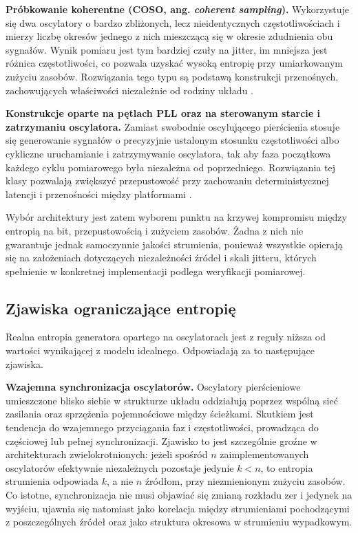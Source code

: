 \textbf{Próbkowanie koherentne (COSO, ang. \emph{coherent sampling}).}
Wykorzystuje się dwa oscylatory o bardzo zbliżonych, lecz nieidentycznych
częstotliwościach i mierzy liczbę okresów jednego z nich mieszczącą się
w okresie zdudnienia obu sygnałów. Wynik pomiaru jest tym bardziej czuły na
jitter, im mniejsza jest różnica częstotliwości, co pozwala uzyskać wysoką
entropię przy umiarkowanym zużyciu zasobów. Rozwiązania tego typu są
podstawą konstrukcji przenośnych, zachowujących właściwości niezależnie od
rodziny układu \cite{peetermans2019portable}.

\textbf{Konstrukcje oparte na pętlach PLL oraz na sterowanym starcie
i zatrzymaniu oscylatora.} Zamiast swobodnie oscylującego pierścienia
stosuje się generowanie sygnałów o precyzyjnie ustalonym stosunku
częstotliwości albo cykliczne uruchamianie i zatrzymywanie oscylatora, tak
aby faza początkowa każdego cyklu pomiarowego była niezależna od
poprzedniego. Rozwiązania tej klasy pozwalają zwiększyć przepustowość przy
zachowaniu deterministycznej latencji i przenośności między
platformami \cite{matuszewski2024startstop}.

Wybór architektury jest zatem wyborem punktu na krzywej kompromisu między
entropią na bit, przepustowością i zużyciem zasobów. Żadna z nich nie
gwarantuje jednak samoczynnie jakości strumienia, ponieważ wszystkie opierają
się na założeniach dotyczących niezależności źródeł i skali jitteru, których
spełnienie w konkretnej implementacji podlega weryfikacji pomiarowej.

\subsection{Zjawiska ograniczające entropię}

Realna entropia generatora opartego na oscylatorach jest z reguły niższa od
wartości wynikającej z modelu idealnego. Odpowiadają za to następujące
zjawiska.

\textbf{Wzajemna synchronizacja oscylatorów.} Oscylatory pierścieniowe
umieszczone blisko siebie w strukturze układu oddziałują poprzez wspólną sieć
zasilania oraz sprzężenia pojemnościowe między ścieżkami. Skutkiem jest
tendencja do wzajemnego przyciągania faz i częstotliwości, prowadząca do
częściowej lub pełnej synchronizacji. Zjawisko to jest szczególnie groźne
w architekturach zwielokrotnionych: jeżeli spośród $n$ zaimplementowanych
oscylatorów efektywnie niezależnych pozostaje jedynie $k < n$, to entropia
strumienia odpowiada $k$, a nie $n$ źródłom, przy niezmienionym zużyciu
zasobów. Co istotne, synchronizacja nie musi objawiać się zmianą rozkładu
zer i jedynek na wyjściu, ujawnia się natomiast jako korelacja między
strumieniami pochodzącymi z poszczególnych źródeł oraz jako struktura
okresowa w strumieniu wypadkowym.

